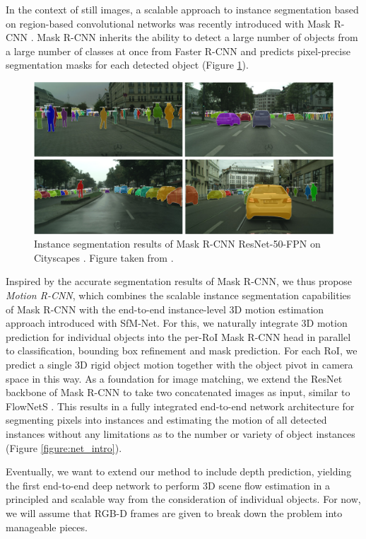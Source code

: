 In the context of still images, a
scalable approach to instance segmentation based on region-based convolutional networks
was recently introduced with Mask R-CNN \cite{MaskRCNN}.
Mask R-CNN inherits the ability to detect
a large number of objects from a large number of classes at once from Faster R-CNN \cite{FasterRCNN}
and predicts pixel-precise segmentation masks for each detected object (Figure \ref{figure:maskrcnn_cs}).

\begin{figure}[t]
  \centering
  \includegraphics[width=\textwidth]{figures/maskrcnn_cs}
\caption{
Instance segmentation results of Mask R-CNN ResNet-50-FPN \cite{MaskRCNN}
on Cityscapes \cite{Cityscapes}. Figure taken from \cite{MaskRCNN}.
}
\label{figure:maskrcnn_cs}
\end{figure}
Inspired by the accurate segmentation results of Mask R-CNN,
we thus propose \emph{Motion R-CNN}, which combines the scalable instance segmentation capabilities of
Mask R-CNN with the end-to-end instance-level 3D motion estimation approach introduced with SfM-Net.
For this, we naturally integrate 3D motion prediction for individual objects into the per-RoI Mask R-CNN head
in parallel to classification, bounding box refinement and mask prediction.
For each RoI, we predict a single 3D rigid object motion together with the object
pivot in camera space in this way.
As a foundation for image matching, we extend the ResNet \cite{ResNet} backbone of Mask R-CNN to take
two concatenated images as input, similar to FlowNetS \cite{FlowNet}.
This results in a fully integrated end-to-end network architecture for segmenting pixels into instances
and estimating the motion of all detected instances without any limitations
as to the number or variety of object instances (Figure \ref{figure:net_intro}).

Eventually, we want to extend our method to include depth prediction,
yielding the first end-to-end deep network to perform 3D scene flow estimation
in a principled and scalable way from the consideration of individual objects.
For now, we will assume that RGB-D frames are given to break down the problem into
manageable pieces.

